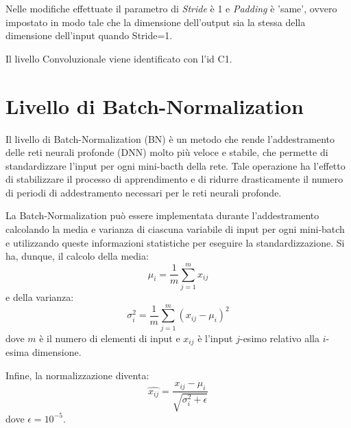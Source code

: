 Nelle modifiche effettuate il parametro di \textit{Stride} è 1 e \textit{Padding} è 'same', ovvero impostato in modo tale che la dimensione dell'output sia la stessa della dimensione dell'input quando Stride=1.

Il livello Convoluzionale viene identificato con l'id C1.

\section{Livello di Batch-Normalization}
Il livello di Batch-Normalization (BN) è un metodo che rende l'addestramento delle reti neurali profonde (DNN) molto più veloce e stabile, che permette di standardizzare l'input per ogni mini-bacth della rete. Tale operazione ha l'effetto di stabilizzare il processo di apprendimento e di ridurre drasticamente il numero di periodi di addestramento necessari per le reti neurali profonde.

La Batch-Normalization può essere implementata durante l'addestramento calcolando la media e varianza di ciascuna variabile di input per ogni mini-batch e utilizzando queste informazioni statistiche per eseguire la standardizzazione. Si ha, dunque, il calcolo della media:
\begin{equation}
	\mu_{i} = \frac{1}{m}\sum_{j=1}^{m}x_{ij}
\end{equation}
e della varianza:
\begin{equation}
	\sigma_{i}^{2} = \frac{1}{m}\sum_{j=1}^{m}(x_{ij}-\mu_{i})^{2}
\end{equation}
dove $m$ è il numero di elementi di input e $x_{ij}$ è l'input $j$-esimo relativo alla $i$-esima dimensione.

Infine, la normalizzazione diventa:
\begin{equation}
	\hat{x_{ij}} = \frac{x_{ij} - \mu_{i}}{\sqrt{\sigma_{i}^{2}+\epsilon}}
\end{equation}
dove $\epsilon=10^{-5}$.



